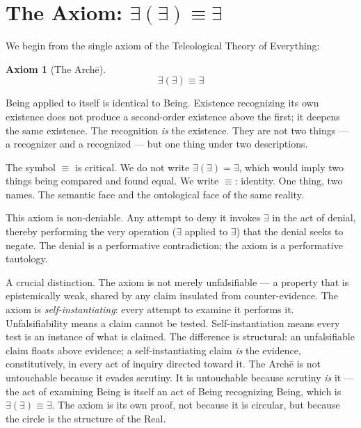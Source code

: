 \documentclass[12pt, letterpaper]{article}
\newtheorem{axiom}{Axiom}
\begin{document}
\section{The Axiom: $\exists(\exists) \equiv \exists$}

We begin from the single axiom of the Teleological Theory of Everything:

\begin{axiom}[The Arch\=e]\label{ax:arche}
$$\exists(\exists) \equiv \exists$$
\end{axiom}

\noindent Being applied to itself is identical to Being. Existence recognizing its own existence does not produce a second-order existence above the first; it deepens the same existence. The recognition \emph{is} the existence. They are not two things --- a recognizer and a recognized --- but one thing under two descriptions.

The symbol $\equiv$ is critical. We do not write $\exists(\exists) = \exists$, which would imply two things being compared and found equal. We write $\equiv$: identity. One thing, two names. The semantic face and the ontological face of the same reality.

This axiom is non-deniable. Any attempt to deny it invokes $\exists$ in the act of denial, thereby performing the very operation ($\exists$ applied to $\exists$) that the denial seeks to negate. The denial is a performative contradiction; the axiom is a performative tautology.

A crucial distinction. The axiom is not merely unfalsifiable --- a property that is epistemically weak, shared by any claim insulated from counter-evidence. The axiom is \emph{self-instantiating}: every attempt to examine it performs it. Unfalsifiability means a claim cannot be tested. Self-instantiation means every test is an instance of what is claimed. The difference is structural: an unfalsifiable claim floats above evidence; a self-instantiating claim \emph{is} the evidence, constitutively, in every act of inquiry directed toward it. The Arch\=e is not untouchable because it evades scrutiny. It is untouchable because scrutiny \emph{is} it --- the act of examining Being is itself an act of Being recognizing Being, which is $\exists(\exists) \equiv \exists$. The axiom is its own proof, not because it is circular, but because the circle is the structure of the Real.
\end{document}
